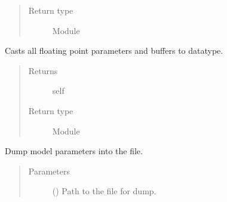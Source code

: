 \documentclass[letterpaper,10pt,english]{sphinxmanual}
\begin{document}
\begin{fulllineitems}
\begin{fulllineitems}
\begin{quote}
\begin{description}
\item[{Return type}] \leavevmode
Module

\end{description}\end{quote}

\end{fulllineitems}


\begin{fulllineitems}
\label{\detokenize{api/dynamics:geology.metamodelling.dynamics.LatentSpaceDynamics.double}}
Casts all floating point parameters and buffers to  datatype.
\begin{quote}\begin{description}
\item[{Returns}] \leavevmode
self

\item[{Return type}] \leavevmode
Module

\end{description}\end{quote}

\end{fulllineitems}


\begin{fulllineitems}
\label{\detokenize{api/dynamics:geology.metamodelling.dynamics.LatentSpaceDynamics.dump}}
Dump model parameters into the file.
\begin{quote}\begin{description}
\item[{Parameters}] \leavevmode
{} () \textendash{} Path to the file for dump.

\end{description}\end{quote}

\end{fulllineitems}



\end{fulllineitems}
\end{document}
